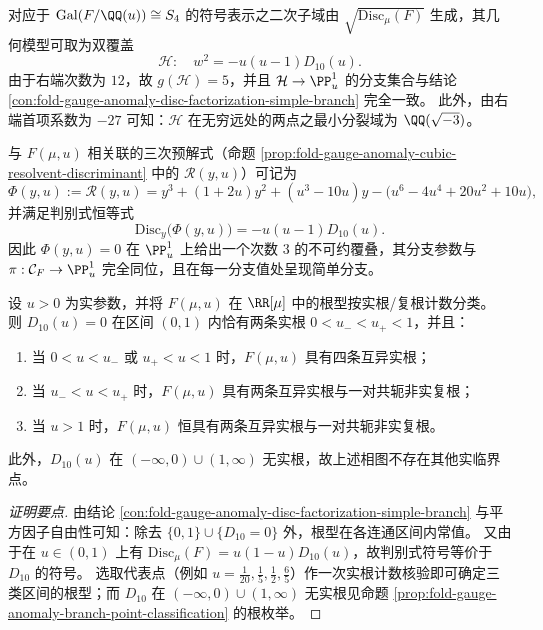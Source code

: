\begin{conclusion}\label{con:fold-gauge-anomaly-sign-quadratic-cover}
对应于 \(\mathrm{Gal}(F/\QQ(u))\cong S_4\) 的符号表示之二次子域由 \(\sqrt{\mathrm{Disc}_{\mu}(F)}\) 生成，其几何模型可取为双覆盖
\[
\mathcal H:\quad w^2=-u(u-1)D_{10}(u).
\]
由于右端次数为 \(12\)，故 \(g(\mathcal H)=5\)，并且 \(\mathcal H\to\PP^1_u\) 的分支集合与结论 \ref{con:fold-gauge-anomaly-disc-factorization-simple-branch} 完全一致。
此外，由右端首项系数为 \(-27\) 可知：\(\mathcal H\) 在无穷远处的两点之最小分裂域为 \(\QQ(\sqrt{-3})\)。
\end{conclusion}

\begin{conclusion}\label{con:fold-gauge-anomaly-cubic-resolvent}
与 \(F(\mu,u)\) 相关联的三次预解式（命题 \ref{prop:fold-gauge-anomaly-cubic-resolvent-discriminant} 中的 \(\mathcal R(y,u)\)）可记为
\[
\Phi(y,u):=\mathcal R(y,u)=y^3+(1+2u)y^2+(u^3-10u)y-\bigl(u^6-4u^4+20u^2+10u\bigr),
\]
并满足判别式恒等式
\[
\mathrm{Disc}_{y}\bigl(\Phi(y,u)\bigr)=-u(u-1)D_{10}(u).
\]
因此 \(\Phi(y,u)=0\) 在 \(\PP^1_u\) 上给出一个次数 \(3\) 的不可约覆叠，其分支参数与 \(\pi:\mathcal C_F\to\PP^1_u\) 完全同位，且在每一分支值处呈现简单分支。
\end{conclusion}

\begin{conclusion}\label{con:fold-gauge-anomaly-real-complex-phase}
设 \(u>0\) 为实参数，并将 \(F(\mu,u)\) 在 \(\RR[\mu]\) 中的根型按实根/复根计数分类。
则 \(D_{10}(u)=0\) 在区间 \((0,1)\) 内恰有两条实根
\(
0<u_-<u_+<1
\)，并且：
\begin{enumerate}
  \item 当 \(0<u<u_-\) 或 \(u_+<u<1\) 时，\(F(\mu,u)\) 具有四条互异实根；
  \item 当 \(u_-<u<u_+\) 时，\(F(\mu,u)\) 具有两条互异实根与一对共轭非实复根；
  \item 当 \(u>1\) 时，\(F(\mu,u)\) 恒具有两条互异实根与一对共轭非实复根。
\end{enumerate}
此外，\(D_{10}(u)\) 在 \((-\infty,0)\cup(1,\infty)\) 无实根，故上述相图不存在其他实临界点。
\end{conclusion}
\begin{proof}[证明要点]
由结论 \ref{con:fold-gauge-anomaly-disc-factorization-simple-branch} 与平方因子自由性可知：除去 \(\{0,1\}\cup\{D_{10}=0\}\) 外，根型在各连通区间内常值。
又由于在 \(u\in(0,1)\) 上有 \(\mathrm{Disc}_{\mu}(F)=u(1-u)D_{10}(u)\)，故判别式符号等价于 \(D_{10}\) 的符号。
选取代表点（例如 \(u=\frac1{20},\frac15,\frac12,\frac65\)）作一次实根计数核验即可确定三类区间的根型；而 \(D_{10}\) 在 \((-\infty,0)\cup(1,\infty)\) 无实根见命题 \ref{prop:fold-gauge-anomaly-branch-point-classification} 的根枚举。
\end{proof}


